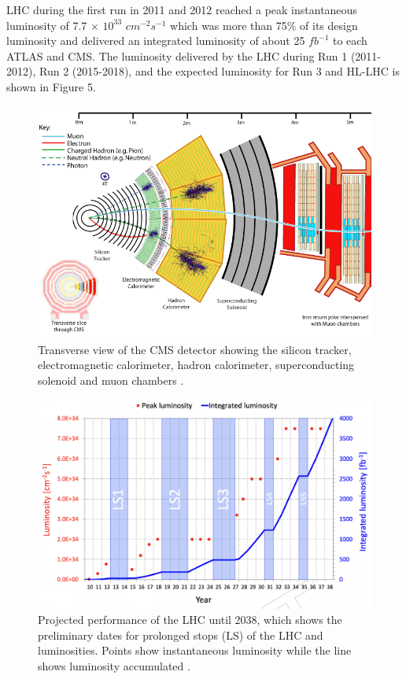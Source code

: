 \documentclass[final,3p]{CSP}
\begin{document}
LHC during the first run in 2011 and 2012 reached a peak instantaneous luminosity of 7.7 $\times$ $10^{33}$ $cm^{-2}s^{-1}$ which was more than 75$\%$ of its design luminosity and delivered an integrated luminosity of about 25 $fb^{-1}$ to each ATLAS and CMS. The luminosity delivered by the LHC during Run 1 (2011-2012),  Run 2 (2015-2018), and the expected luminosity for Run 3 and HL-LHC is shown in Figure 5. 

\clearpage
  \begin{figure}[H]
    \centering
    \includegraphics[width=0.6\columnwidth]{./cms12.png}
    \caption{Transverse view of the CMS detector showing the silicon tracker, electromagnetic calorimeter, hadron calorimeter, superconducting solenoid and muon chambers \cite{Chatrchyan:2008aa}.}
    \label{figure5}
  \end{figure}
  
  \begin{figure}[H]
    \centering
    \includegraphics[width=0.9\columnwidth]{./HLLHCLumi.png}
    \caption{Projected performance of the LHC until 2038, which shows the preliminary dates for prolonged stops (LS) of the LHC and luminosities. Points show instantaneous luminosity while the line shows luminosity accumulated \cite{collaborations2019report}.}
    \label{figure6}
  \end{figure}
\end{document}
